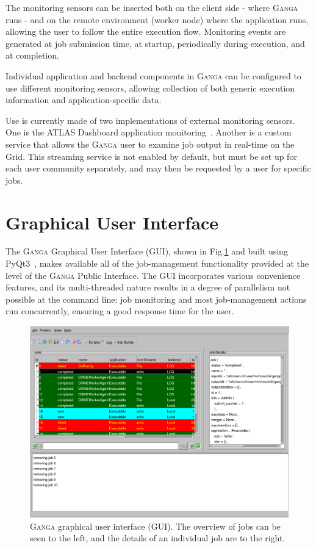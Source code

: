 \documentclass{elsart}
\def\atlas {ATLAS\xspace}
\def\ganga {\textsc{Ganga}\xspace}
\def\grid {Grid\xspace}
\begin{document}
The monitoring sensors can be inserted both on the client side - where \ganga
runs - and on the remote environment (worker node) where the application
runs, allowing the user to follow the entire execution flow.  Monitoring
events are generated at job submission time, at startup, periodically
during execution, and at completion.

Individual application and backend components in \ganga can be configured to use
different monitoring sensors, allowing collection of both generic execution
information and application-specific data.

Use is currently made of two implementations of external monitoring sensors. One
is the \atlas Dashboard application monitoring~\cite{andreeva_2008}.
Another is a custom service that allows the \ganga user to examine job output
in real-time on the \grid.  This streaming service
is not enabled by default, but must be set up for each user community separately,
and may then be requested by a user for specific jobs.

\section{Graphical User Interface}
\label{sec:GUI}

The \ganga Graphical User Interface (GUI), shown in  Fig.\ref{fig:GUI} and
built using PyQt3~\cite{rempt_2001}, makes available all of the job-management
functionality provided at the level of the \ganga Public Interface.  The
GUI incorporates various convenience features, and its multi-threaded nature
results in a degree of parallelism not possible at the command line:
job monitoring and most job-management actions run concurrently, ensuring
a good response time for the user.

\begin{figure}[ht!]
  \centering
  \includegraphics[width=1 \textwidth]{ganga-GUI.png}
  \caption{\ganga graphical user interface (GUI).  The overview of jobs
   can be seen to the left, and the details of an individual job are to
   the right.}
  \label{fig:GUI}
\end{figure}
\end{document}
